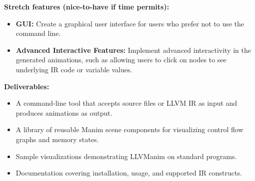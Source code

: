 \textbf{Stretch features (nice-to-have if time permits):}
\begin{itemize}
  \item \textbf{GUI:} Create a graphical user interface for users who prefer not to use the command line.
  \item \textbf{Advanced Interactive Features:} Implement advanced interactivity in the generated animations, such as allowing users to click on nodes to see underlying IR code or variable values.
\end{itemize}

\textbf{Deliverables:}
\begin{itemize}
\item A command-line tool that accepts source files or LLVM IR as input and produces animations as output.
\item A library of reusable Manim scene components for visualizing control flow graphs and memory states.
\item Sample visualizations demonstrating LLVManim on standard programs.
\item Documentation covering installation, usage, and supported IR constructs.
\end{itemize}
